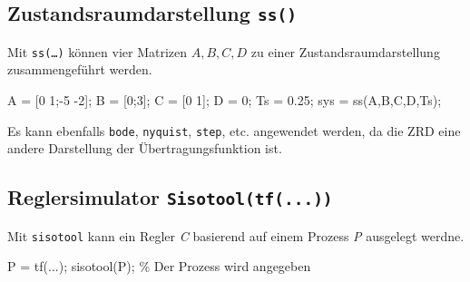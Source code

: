 \documentclass[
  10pt,
  a4paper,
]{article}
\newenvironment{Shaded}{}{}
\newcommand{\CommentTok}[1]{\textcolor[rgb]{0.42,0.45,0.49}{#1}}
\newcommand{\FloatTok}[1]{\textcolor[rgb]{0.00,0.36,0.77}{#1}}
\newcommand{\NormalTok}[1]{\textcolor[rgb]{0.14,0.16,0.18}{#1}}
\newcommand{\OperatorTok}[1]{\textcolor[rgb]{0.14,0.16,0.18}{#1}}
\newcommand{\VariableTok}[1]{\textcolor[rgb]{0.89,0.38,0.04}{#1}}
\numberwithin{equation}{section}
\begin{document}
\begin{multicols}{2}
\begin{figure}[H]
{}

\end{figure}

\hypertarget{zustandsraumdarstellung-ss}{%
\subsection{\texorpdfstring{Zustandsraumdarstellung
\texttt{ss()}}{Zustandsraumdarstellung ss()}}\label{zustandsraumdarstellung-ss}}

Mit \texttt{ss(…)} können vier Matrizen \(A, B,C,D\) zu einer
Zustandsraumdarstellung zusammengeführt werden.

\begin{Shaded}
\begin{Highlighting}[]
\VariableTok{A} \OperatorTok{=}\NormalTok{ [}\FloatTok{0} \FloatTok{1}\OperatorTok{;{-}}\FloatTok{5} \OperatorTok{{-}}\FloatTok{2}\NormalTok{]}\OperatorTok{;}
\VariableTok{B} \OperatorTok{=}\NormalTok{ [}\FloatTok{0}\OperatorTok{;}\FloatTok{3}\NormalTok{]}\OperatorTok{;}
\VariableTok{C} \OperatorTok{=}\NormalTok{ [}\FloatTok{0} \FloatTok{1}\NormalTok{]}\OperatorTok{;}
\VariableTok{D} \OperatorTok{=} \FloatTok{0}\OperatorTok{;}
\VariableTok{Ts} \OperatorTok{=} \FloatTok{0.25}\OperatorTok{;}
\VariableTok{sys} \OperatorTok{=} \VariableTok{ss}\NormalTok{(}\VariableTok{A}\OperatorTok{,}\VariableTok{B}\OperatorTok{,}\VariableTok{C}\OperatorTok{,}\VariableTok{D}\OperatorTok{,}\VariableTok{Ts}\NormalTok{)}\OperatorTok{;}
\end{Highlighting}
\end{Shaded}

Es kann ebenfalls \texttt{bode}, \texttt{nyquist}, \texttt{step}, etc.
angewendet werden, da die ZRD eine andere Darstellung der
Übertragungsfunktion ist.

\hypertarget{reglersimulator-sisotooltf...}{%
\subsection{\texorpdfstring{Reglersimulator
\texttt{Sisotool(tf(...))}}{Reglersimulator Sisotool(tf(...))}}\label{reglersimulator-sisotooltf...}}

Mit \texttt{sisotool} kann ein Regler \emph{C} basierend auf einem
Prozess \emph{P} ausgelegt werdne.

\begin{Shaded}
\begin{Highlighting}[]
\VariableTok{P} \OperatorTok{=} \VariableTok{tf}\NormalTok{(}\OperatorTok{...}\NormalTok{)}\OperatorTok{;}
\VariableTok{sisotool}\NormalTok{(}\VariableTok{P}\NormalTok{)}\OperatorTok{;} \CommentTok{\% Der Prozess wird angegeben}
\end{Highlighting}
\end{Shaded}


\end{multicols}
\end{document}
